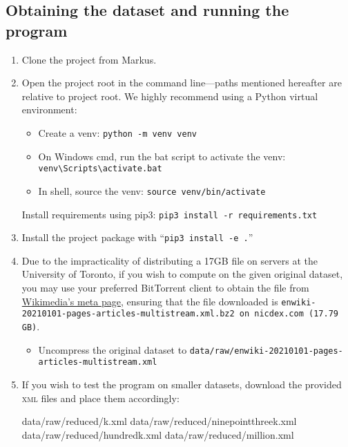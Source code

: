 \documentclass[fontsize=12pt]{article}
\newcommand{\py}[1]{\texttt{#1}}
\begin{document}
\begin{multicols}{2}
\section{Obtaining the dataset and running the program}
\begin{enumerate}
    \item Clone the project from Markus.
    \item Open the project root in the command line---paths mentioned hereafter are relative to project root. We highly recommend using a Python virtual environment: \begin{itemize}
        \item Create a venv: \py{python -m venv venv}
        \item On Windows cmd, run the bat script to activate the venv: \texttt{venv\textbackslash Scripts\textbackslash activate.bat}
        \item In shell, source the venv: \texttt{source venv/bin/activate}
    \end{itemize}
     Install requirements using pip3: \texttt{pip3 install -r requirements.txt}
    \item Install the project package with ``\py{pip3 install -e .}''
    \item Due to the impracticality of distributing a 17GB file on servers at the University of Toronto, if you wish to compute on the given original dataset, you may use your preferred BitTorrent client to obtain the file from \href{https://meta.wikimedia.org/wiki/Data_dump_torrents#English_Wikipedia}{Wikimedia's meta page}, ensuring that the file downloaded is \texttt{enwiki-20210101-pages-articles-multistream.xml.bz2 on nicdex.com (17.79 GB)}. \begin{itemize}
        \item Uncompress the original dataset to \texttt{data/raw/enwiki-20210101-pages-articles-multistream.xml}
    \end{itemize}
    \item If you wish to test the program on smaller datasets, download the provided \textsc{xml} files and place them accordingly: \begin{verbatim*}
data/raw/reduced/k.xml
data/raw/reduced/ninepointthreek.xml
data/raw/reduced/hundredk.xml
data/raw/reduced/million.xml

\end{verbatim*}
\end{enumerate}
\end{multicols}
\end{document}
